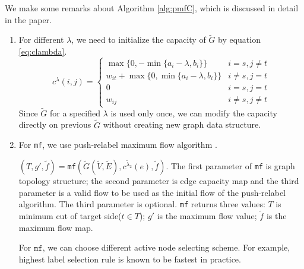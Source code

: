 \documentclass{article}
\begin{document}
We make some remarks about Algorithm \ref{alg:pmfC}, which is discussed in detail in the paper.
\begin{enumerate}
\item For different $\lambda$, we need to initialize the capacity of $\widetilde{G}$ by equation \eqref{eq:clambda}.
\begin{equation}\label{eq:clambda}
c^{\lambda}(i, j) = 
\begin{cases}
\max\{0, -\min\{a_i-\lambda, b_i\}\} &  i = s, j \neq t \\
w_{it} + \max\{0, \min\{a_i - \lambda, b_i\}\} & i\neq s, j = t\\
0 & i = s, j = t\\
w_{ij} & i \neq s, j \neq t
\end{cases}
\end{equation}
Since $\widetilde{G}$ for a specified $\lambda$ is used only once, we can modify the capacity directly on previous $\widetilde{G}$ without creating new graph data structure.

\item For \texttt{mf}, we use push-relabel maximum flow algorithm \cite{Goldberg}.

 $(T,g',\tilde{f})=$\texttt{mf}$(\widetilde{G}(\widetilde{V}, \widetilde{E}), c^{\tilde{\lambda}_2}(e), \tilde{f})$. The first parameter of \texttt{mf} is graph topology structure; the second parameter is edge capacity map and the third parameter is a valid flow to be used as the initial flow of the push-relabel algorithm. The third parameter is optional. \texttt{mf} returns three values: $T$ is minimum cut of target side($t\in T$); $g'$ is the maximum flow value; $\tilde{f}$ is the maximum flow map.

For $\texttt{mf}$, we can choose different active node selecting scheme. For example, highest label selection rule is known to be fastest in practice.


\end{enumerate}
\end{document}
